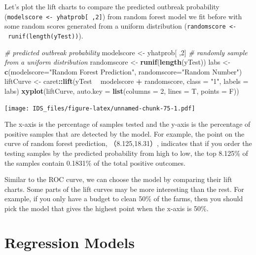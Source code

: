 \documentclass[12pt,]{krantz}
\makeatletter
\newenvironment{Shaded}{\begin{snugshade}}{\end{snugshade}}
\newcommand{\CommentTok}[1]{\textcolor[rgb]{0.37,0.37,0.37}{\textit{#1}}}
\newcommand{\DataTypeTok}[1]{\textcolor[rgb]{0.27,0.27,0.27}{#1}}
\newcommand{\DecValTok}[1]{\textcolor[rgb]{0.06,0.06,0.06}{#1}}
\newcommand{\KeywordTok}[1]{\textcolor[rgb]{0.27,0.27,0.27}{\textbf{#1}}}
\newcommand{\NormalTok}[1]{#1}
\newcommand{\OperatorTok}[1]{\textcolor[rgb]{0.43,0.43,0.43}{\textbf{#1}}}
\newcommand{\StringTok}[1]{\textcolor[rgb]{0.5,0.5,0.5}{#1}}
\newenvironment{kframe}{%
\medskip{}
\setlength{\fboxsep}{.8em}
 \def\at@end@of@kframe{}%
 \ifinner\ifhmode%
  \def\at@end@of@kframe{\end{minipage}}%
  \begin{minipage}{\columnwidth}%
 \fi\fi%
 \def\FrameCommand##1{\hskip\@totalleftmargin \hskip-\fboxsep
 \colorbox{shadecolor}{##1}\hskip-\fboxsep
     \hskip-\linewidth \hskip-\@totalleftmargin \hskip\columnwidth}%
 \MakeFramed {\advance\hsize-\width
   \@totalleftmargin\z@ \linewidth\hsize
   \@setminipage}}%
 {\par\unskip\endMakeFramed%
 \at@end@of@kframe}
\renewenvironment{Shaded}{\begin{kframe}}{\end{kframe}}
\makeatother
\begin{document}
Let's plot the lift charts to compare the predicted outbreak probability (\texttt{modelscore\ \textless{}-\ yhatprob{[}\ ,2{]}}) from random forest model we fit before with some random scores generated from a uniform distribution (\texttt{randomscore\ \textless{}-\ runif(length(yTest))}).

\begin{Shaded}
\begin{Highlighting}[]
\CommentTok{# predicted outbreak probability}
\NormalTok{modelscore <-}\StringTok{ }\NormalTok{yhatprob[ ,}\DecValTok{2}\NormalTok{]}
\CommentTok{# randomly sample from a uniform distribution}
\NormalTok{randomscore <-}\StringTok{ }\KeywordTok{runif}\NormalTok{(}\KeywordTok{length}\NormalTok{(yTest))}
\NormalTok{labs <-}\StringTok{ }\KeywordTok{c}\NormalTok{(}\DataTypeTok{modelscore=}\StringTok{"Random Forest Prediction"}\NormalTok{,}
        \DataTypeTok{randomscore=}\StringTok{"Random Number"}\NormalTok{)}
\NormalTok{liftCurve <-}\StringTok{ }\NormalTok{caret}\OperatorTok{::}\KeywordTok{lift}\NormalTok{(yTest }\OperatorTok{~}\StringTok{ }\NormalTok{modelscore }\OperatorTok{+}\StringTok{ }\NormalTok{randomscore,}
                  \DataTypeTok{class =} \StringTok{"1"}\NormalTok{, }
                  \DataTypeTok{labels =}\NormalTok{ labs)}
\KeywordTok{xyplot}\NormalTok{(liftCurve, }\DataTypeTok{auto.key =} \KeywordTok{list}\NormalTok{(}\DataTypeTok{columns =} \DecValTok{2}\NormalTok{, }\DataTypeTok{lines =}\NormalTok{ T, }\DataTypeTok{points =}\NormalTok{ F))}
\end{Highlighting}
\end{Shaded}

\texttt{[image: IDS\_files/figure-latex/unnamed-chunk-75-1.pdf]}

The x-axis is the percentage of samples tested and the y-axis is the percentage of positive samples that are detected by the model. For example, the point on the curve of random forest prediction, （8.125,18.31）, indicates that if you order the testing samples by the predicted probability from high to low, the top 8.125\% of the samples contain 0.1831\% of the total positive outcomes.

Similar to the ROC curve, we can choose the model by comparing their lift charts. Some parts of the lift curves may be more interesting than the rest. For example, if you only have a budget to clean 50\% of the farms, then you should pick the model that gives the highest point when the x-axis is 50\%.

\hypertarget{regression-models}{%
\chapter{Regression Models}\label{regression-models}}
\end{document}

